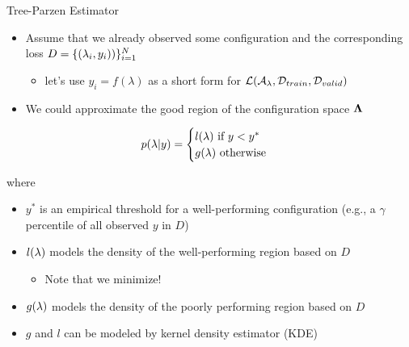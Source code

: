 \begin{frame}[c,fragile]{Tree-Parzen Estimator }

\begin{itemize}
	\item Assume that we already observed some configuration and the corresponding loss $D = \{(\mathbf{\lambda}_i, y_i))\}_{i=1}^N$
	\begin{itemize}
		\item let's use $y_i = f(\lambda)$ as a short form for $\mathcal{L}(\mathcal{A}_{\mathbf{\lambda}}, \mathcal{D}_{train}, \mathcal{D}_{valid})$
	\end{itemize}
	\item We could approximate the good region of the configuration space $\mathbf{\Lambda}$
\end{itemize}

$$
p(\mathbf{\lambda}|y) = \begin{cases}
l(\mathbf{\lambda}) \text{ if } y < y^*\\
g(\mathbf{\lambda}) \text{ otherwise} 
\end{cases}
$$

where 
\begin{itemize}
	\item $y^*$ is an empirical threshold for a well-performing configuration (e.g., a $\gamma$ percentile of all observed $y$ in $D$)
	\item $l(\mathbf{\lambda})$ models the density of the well-performing region based on $D$
	\begin{itemize}
		\item Note that we minimize!
	\end{itemize}
	\item $g(\mathbf{\lambda})$ models the density of the poorly performing region based on $D$
	\item $g$ and $l$ can be modeled by kernel density estimator (KDE)
\end{itemize}

\end{frame}
